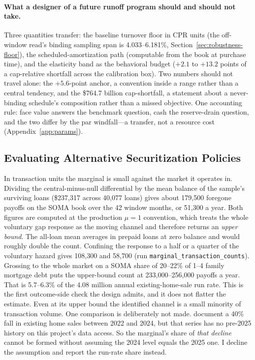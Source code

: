 \documentclass[12pt]{article}
\begin{document}
\paragraph{What a designer of a future runoff program should and should not take.} Three quantities transfer: the baseline turnover floor in CPR units (the off-window read's binding sampling span is 4.033--6.181\%, Section~\ref{sec:robustness-floor}), the scheduled-amortization path (computable from the book at purchase time), and the elasticity band as the behavioral budget ($+2.1$ to $+13.2$ points of a cap-relative shortfall across the calibration box). Two numbers should not travel alone: the $+5.6$-point anchor, a convention inside a range rather than a central tendency, and the \$764.7 billion cap-shortfall, a statement about a never-binding schedule's composition rather than a missed objective. One accounting rule: face value answers the benchmark question, cash the reserve-drain question, and the two differ by the par windfall---a transfer, not a resource cost (Appendix~\ref{app:params}).

\subsection{Evaluating Alternative Securitization Policies}\label{sec:discussion-policy}
In transaction units the marginal is small against the market it operates in. Dividing the central-minus-null differential by the mean balance of the sample's surviving loans (\$237{,}317 across 40{,}077 loans) gives about 179{,}500 foregone payoffs on the SOMA book over the 42 window months, or 51{,}300 a year. Both figures are computed at the production $\mu = 1$ convention, which treats the whole voluntary gap response as the moving channel and therefore returns an \emph{upper bound}. The all-loan mean averages in prepaid loans at zero balance and would roughly double the count. Confining the response to a half or a quarter of the voluntary hazard gives 108{,}300 and 58{,}700 (run \texttt{marginal\_transaction\_counts}). Grossing to the whole market on a SOMA share of 20--22\% of 1--4 family mortgage debt puts the upper-bound count at 233{,}000--256{,}000 payoffs a year. That is 5.7--6.3\% of the 4.08 million annual existing-home-sale run rate. This is the first outcome-side check the design admits, and it does not flatter the estimate. Even at its upper bound the identified channel is a small minority of transaction volume. One comparison is deliberately not made. \citet{fonseca2026} document a 40\% fall in existing home sales between 2022 and 2024, but that series has no pre-2025 history on this project's data access. So the marginal's share of \emph{that decline} cannot be formed without assuming the 2024 level equals the 2025 one. I decline the assumption and report the run-rate share instead.
\end{document}
